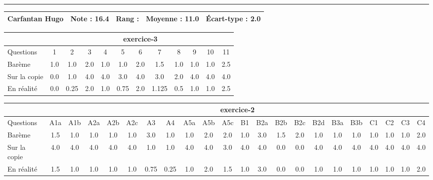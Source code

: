\documentclass[a4paper, landscape, 10pt]{article}
\begin{document}
  \vspace{0.3cm}
  \hrule
  \vspace{0.3cm}

  \begin{minipage}{\textwidth}
    { \bf
    \begin{tabular}{|c|*{4}{c|}}
    \hline
      Carfantan Hugo & Note : 16.4 & Rang :  & Moyenne : 11.0 & \'Ecart-type : 2.0 \\
    \hline
    \end{tabular}
    }
    
      \begin{tabular}{|l|*{ 11 }{c|}}
        \hline
        & \multicolumn{ 11 }{c|}{ exercice-3 } \\
        \hline
        Questions & 1&2&3&4&5&6&7&8&9&10&11 \\
        \hline
        Barème & 1.0&1.0&2.0&1.0&1.0&2.0&1.5&1.0&1.0&1.0&2.5 \\
        \hline
        Sur la copie & 0.0&1.0&4.0&4.0&3.0&4.0&3.0&2.0&4.0&4.0&4.0 \\
        \hline
        En réalité & 0.0&0.25&2.0&1.0&0.75&2.0&1.125&0.5&1.0&1.0&2.5 \\
        \hline
      \end{tabular}
    
      \begin{tabular}{|l|*{ 21 }{c|}}
        \hline
        & \multicolumn{ 21 }{c|}{ exercice-2 } \\
        \hline
        Questions & A1a&A1b&A2a&A2b&A2c&A3&A4&A5a&A5b&A5c&B1&B2a&B2b&B2c&B2d&B3a&B3b&C1&C2&C3&C4 \\
        \hline
        Barème & 1.5&1.0&1.0&1.0&1.0&3.0&1.0&1.0&2.0&2.0&1.0&3.0&1.5&2.0&1.0&1.0&1.0&1.0&1.0&1.0&2.0 \\
        \hline
        Sur la copie & 4.0&4.0&4.0&4.0&4.0&1.0&1.0&4.0&4.0&3.0&4.0&4.0&0.0&0.0&4.0&4.0&4.0&4.0&4.0&4.0&4.0 \\
        \hline
        En réalité & 1.5&1.0&1.0&1.0&1.0&0.75&0.25&1.0&2.0&1.5&1.0&3.0&0.0&0.0&1.0&1.0&1.0&1.0&1.0&1.0&2.0 \\
        \hline
      \end{tabular}
    

\end{minipage}
\end{document}
